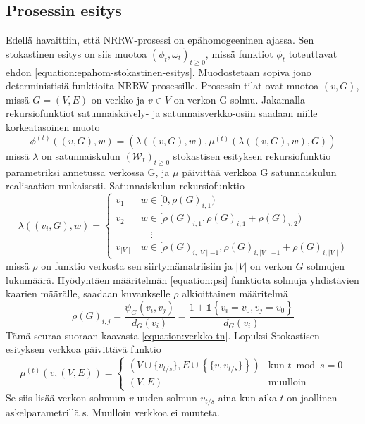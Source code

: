 \documentclass[finnish, 12pt, a4paper, sci, utf8, pdfa]{aaltothesis}
\newcommand{\Wrandom}{\mathcal{W}}
\newcommand{\indicator}{\mathopen{\mathds{1}}}
\begin{document}
\subsection{Prosessin esitys}

Edellä havaittiin, että NRRW-prosessi on epähomogeeninen ajassa. Sen stokastinen esitys on siis muotoa \( (\phi_{t}, \omega_{t})_{t \geq 0} \), missä funktiot \( \phi_{t} \) toteuttavat ehdon \ref{equation:epahom-stokastinen-esitys}. Muodostetaan sopiva jono deterministisiä funktioita NRRW-prosessille. Prosessin tilat ovat muotoa \( (v, G) \), missä \( G = (V, E) \) on verkko ja \( v \in V \) on verkon G solmu. Jakamalla rekursiofunktiot satunnaiskävely- ja satunnaisverkko-osiin saadaan niille korkeatasoinen muoto
\begin{equation}
   \phi^{(t)} \left( (v, G), w \right) = \left( \lambda\left( (v, G), w \right), \mu^{(t)} \left( \lambda\left( (v, G), w \right), G \right) \right)
   \label{equation:esitys-1}
\end{equation}
missä \( \lambda \) on satunnaiskulun \( (\Wrandom_{t})_{t \geq 0} \) stokastisen esityksen rekursiofunktio parametriksi annetussa verkossa G, ja \( \mu \) päivittää verkkoa G satunnaiskulun realisaation mukaisesti. Satunnaiskulun rekursiofunktio
\begin{equation}
   \lambda \left( (v_{i}, G), w \right) = 
   \begin{cases}
      v_{1} & w \in [0, \rho(G)_{i,1}) \\
      v_{2} & w \in [\rho(G)_{i,1}, \rho(G)_{i,1} + \rho(G)_{i,2}) \\
            & \quad \vdots \\
      v_{\mid V \mid} & w \in [\rho(G)_{i,\mid V \mid - 1}, \rho(G)_{i,\mid V \mid - 1} + \rho(G)_{i,\mid V \mid}) 
   \end{cases}
   \label{equation:esitys-kulku}
\end{equation}
missä \( \rho \) on funktio verkosta sen siirtymämatriisiin ja $ |V| $ on verkon $ G $ solmujen lukumäärä. Hyödyntäen määritelmän \ref{equation:psi} funktiota solmuja yhdistävien kaarien määrälle, saadaan kuvaukselle \( \rho \) alkioittainen määritelmä
\begin{equation}
   \rho(G)_{i,j} = \frac{\psi_{G}(v_{i}, v_{j})}{d_{G}(v_{i})} = \frac{1 + \indicator \left\{ v_{i} = v_{0}, v_{j} = v_{0} \right\}}{d_{G}(v_{i})}
   \label{equation:esitys-siirt}
\end{equation}
Tämä seuraa suoraan kaavasta \ref{equation:verkko-tn}. Lopuksi Stokastisen esityksen verkkoa päivittävä funktio
\begin{equation}
   \mu^{(t)} \left( v, (V, E) \right) =
   \begin{cases}
      \left( V \cup \{v_{t/s}\}, E \cup \left\{ \{ v, v_{t/s} \} \right\} \right) & \text{kun } t \bmod s = 0 \\
      \left( V, E \right) & \text{muulloin}
   \end{cases}
   \label{equation:esitys-4}
\end{equation}
Se siis lisää verkon solmuun \( v \) uuden solmun \( v_{t/s} \) aina kun aika $ t $ on jaollinen askelparametrillä s. Muulloin verkkoa ei muuteta.
\end{document}
